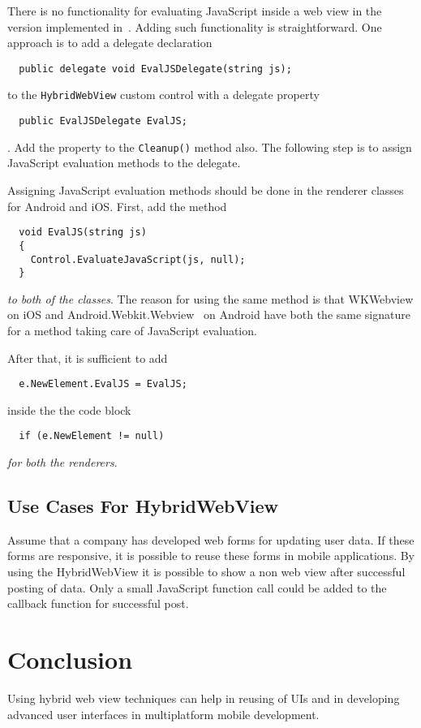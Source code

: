 \documentclass[conference]{IEEEtran}
\newcommand{\code}[1]{{\small\texttt{#1}}}
\begin{document}
There is no functionality for evaluating JavaScript inside a web view in the version implemented in~\cite{hwb}. Adding such functionality is straightforward. One approach is to add a delegate declaration
\begin{lstlisting}
  public delegate void EvalJSDelegate(string js);
\end{lstlisting} to the \code{HybridWebView} custom control with a delegate property
\begin{lstlisting}
  public EvalJSDelegate EvalJS;
\end{lstlisting}. Add the property to the \code{Cleanup()} method also. The following step is to assign JavaScript evaluation methods to the delegate.

Assigning JavaScript evaluation methods should be done in the renderer classes for Android and iOS. First, add the method
\begin{lstlisting}
  void EvalJS(string js)
  {
    Control.EvaluateJavaScript(js, null);
  }
\end{lstlisting} \emph{to both of the classes}. The reason for using the same method is that WKWebview on iOS and Android.Webkit.Webview~\cite{AndroidWebkitWebview} on Android have both the same signature for a method taking care of JavaScript evaluation.

After that, it is sufficient to add
\begin{lstlisting}
  e.NewElement.EvalJS = EvalJS;
\end{lstlisting} inside the the code block
\begin{lstlisting}
  if (e.NewElement != null)
\end{lstlisting} \emph{for both the renderers}.

\subsection{Use Cases For HybridWebView}

Assume that a company has developed web forms for updating user data. If these forms are responsive, it is possible to reuse these forms in mobile applications. By using the HybridWebView it is possible to show a non web view after successful posting of data. Only a small JavaScript function call could be added to the callback function for successful post.

\section{Conclusion}

Using hybrid web view techniques can help in reusing of UIs and in developing advanced user interfaces in multiplatform mobile development.

\nocite{xamarin}
\nocite{xamarin2}
\nocite{xamarin3}


\end{document}
